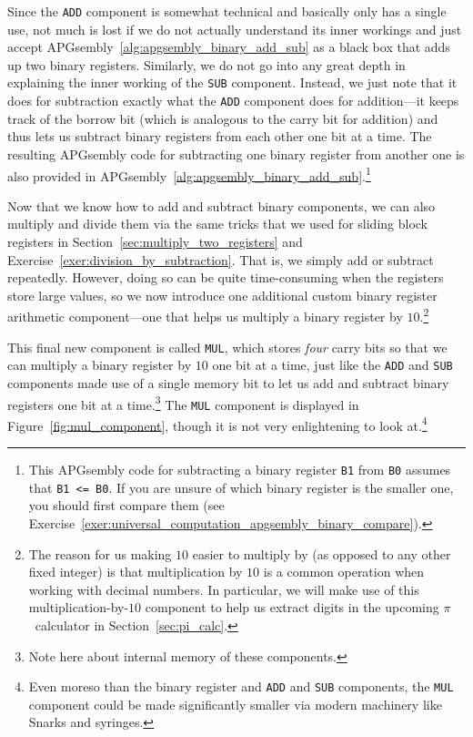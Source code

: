 Since the \texttt{ADD} component is somewhat technical and basically only has a single use, not much is lost if we do not actually understand its inner workings and just accept APGsembly~\ref{alg:apgsembly_binary_add_sub} as a black box that adds up two binary registers. Similarly, we do not go into any great depth in explaining the inner working of the \texttt{SUB} component. Instead, we just note that it does for subtraction exactly what the \texttt{ADD} component does for addition---it keeps track of the borrow bit (which is analogous to the carry bit for addition) and thus lets us subtract binary registers from each other one bit at a time. The resulting APGsembly code for subtracting one binary register from another one is also provided in APGsembly~\ref{alg:apgsembly_binary_add_sub}.\footnote{This APGsembly code for subtracting a binary register \texttt{B1} from \texttt{B0} assumes that \texttt{B1 <= B0}. If you are unsure of which binary register is the smaller one, you should first compare them (see Exercise~\ref{exer:universal_computation_apgsembly_binary_compare}).}

Now that we know how to add and subtract binary components, we can also multiply and divide them via the same tricks that we used for sliding block registers in Section~\ref{sec:multiply_two_registers} and Exercise~\ref{exer:division_by_subtraction}. That is, we simply add or subtract repeatedly. However, doing so can be quite time-consuming when the registers store large values, so we now introduce one additional  custom binary register arithmetic component---one that helps us multiply a binary register by $10$.\footnote{The reason for us making $10$ easier to multiply by (as opposed to any other fixed integer) is that multiplication by $10$ is a common operation when working with decimal numbers. In particular, we will make use of this multiplication-by-$10$ component to help us extract digits in the upcoming $\pi$~calculator in Section~\ref{sec:pi_calc}.}

This final new component is called \texttt{MUL}, which stores \emph{four} carry bits so that we can multiply a binary register by $10$ one bit at a time, just like the \texttt{ADD} and \texttt{SUB} components made use of a single memory bit to let us add and subtract binary registers one bit at a time.\footnote{Note here about internal memory of these components.} The \texttt{MUL} component is displayed in Figure~\ref{fig:mul_component}, though it is not very enlightening to look at.\footnote{Even moreso than the binary register and \texttt{ADD} and \texttt{SUB} components, the \texttt{MUL} component could be made significantly smaller via modern machinery like Snarks and syringes.}

